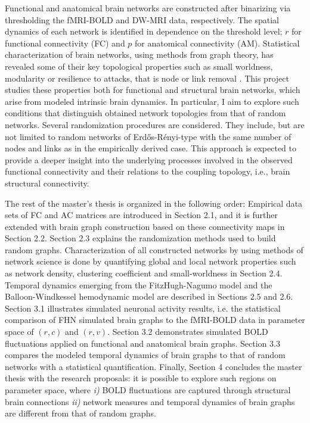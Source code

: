 Functional and anatomical brain networks are constructed after binarizing via thresholding the fMRI-BOLD and DW-MRI data, respectively. The spatial dynamics of each network is identified in dependence on the threshold level; $r$ for functional connectivity (FC) and $p$ for anatomical connectivity (AM). Statistical characterization of brain networks, using methods from graph theory, has revealed some of their key topological properties such as small worldness, modularity or resilience to attacks, that is node or link removal \citep{BUL09}. This project studies these properties both for functional and structural brain networks, which arise from modeled intrinsic brain dynamics. In particular, I aim to explore such conditions that distinguish obtained network topologies from that of random networks. Several randomization procedures are considered. They include, but are not limited to random networks of Erd\H{o}s-R\'{e}nyi-type with the same number of nodes and links as in the empirically derived case. This approach is expected to provide a deeper insight into the underlying processes involved in the observed functional connectivity and their relations to the coupling topology, i.e., brain structural connectivity.


The rest of the master's thesis is organized in the following order: Empirical data sets of FC and AC matrices are introduced in Section 2.1, and it is further extended with brain graph construction based on these connectivity maps in Section 2.2. Section 2.3 explains the randomization methods used to build random graphs. Characterization of all constructed networks by using methods of network science \citep{RUB09, STA10, NEW10, RUB11} is done by quantifying global and local network properties such as network density, clustering coefficient and small-worldness in Section 2.4. Temporal dynamics emerging from the FitzHugh-Nagumo model and the Balloon-Windkessel hemodynamic model \citep{FRI00} are described in Sections 2.5 and 2.6. Section 3.1 illustrates simulated neuronal activity results, i.e. the statistical comparison of FHN simulated brain graphs to the fMRI-BOLD data in parameter space of $(r,c)$ and $(r,v)$.  Section 3.2 demonstrates simulated BOLD fluctuations applied on functional and anatomical brain graphs. Section 3.3 compares the modeled temporal dynamics of brain graphs to that of random networks with a statistical quantification. Finally, Section 4 concludes the master thesis with the research proposals: it is possible to explore such regions on parameter space, where \textit{i)} BOLD fluctuations are captured through structural brain connections \textit{ii)} network measures and temporal dynamics of brain graphs are different from that of random graphs. 
 
 

